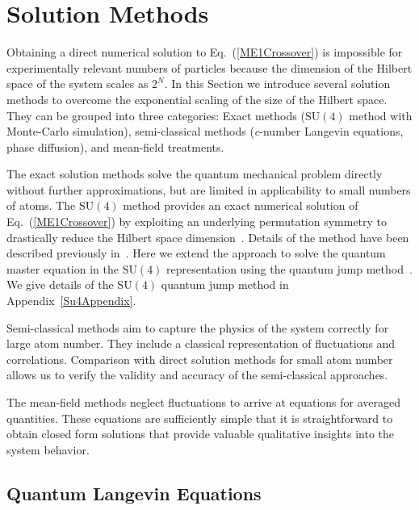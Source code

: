 \documentclass[aps,
twocolumn,
showpacs,
superscriptaddress,groupedaddress]{revtex4}
\begin{document}
\section{Solution Methods}
\label{sec:Methods}

Obtaining a direct numerical solution to Eq.~(\ref{ME1Crossover}) is
impossible for experimentally relevant numbers of particles because the
dimension of the Hilbert space of the system scales as $2^N$.  In this
Section we introduce several solution methods to overcome the
exponential scaling of the size of the Hilbert space.  They can be
grouped into three categories: Exact methods ($\mathrm{SU}(4)$ method
with Monte-Carlo simulation), semi-classical methods (\textit{c}-number
Langevin equations, phase diffusion), and mean-field treatments.

The exact solution methods solve the quantum mechanical problem directly
without further approximations, but are limited in applicability to
small numbers of atoms. The $\mathrm{SU}(4)$ method provides an exact
numerical solution of Eq.~(\ref{ME1Crossover}) by exploiting an
underlying permutation symmetry to drastically reduce the Hilbert space
dimension~\cite{Hartmann:arXiv1201.1732, PhysRevA.87.062101}. Details of
the method have been described previously in~\cite{PhysRevA.87.062101}.
Here we extend the approach to solve the quantum master equation in the
$\mathrm{SU}(4)$ representation using the quantum jump
method~\cite{Dalibard92,Dum92,Knight98}.  We give details of the
$\mathrm{SU}(4)$ quantum jump method in Appendix~\ref{Su4Appendix}.

Semi-classical methods aim to capture the physics of the system
correctly for large atom number.  They include a classical
representation of fluctuations and correlations.  Comparison with
direct solution methods for small atom number allows us to verify the
validity and accuracy of the semi-classical approaches.

The mean-field methods neglect fluctuations to arrive at equations for
averaged quantities. These equations are sufficiently simple that it is
straightforward to obtain closed form solutions that provide valuable
qualitative insights into the system behavior.


\subsection{Quantum Langevin Equations}
\end{document}
